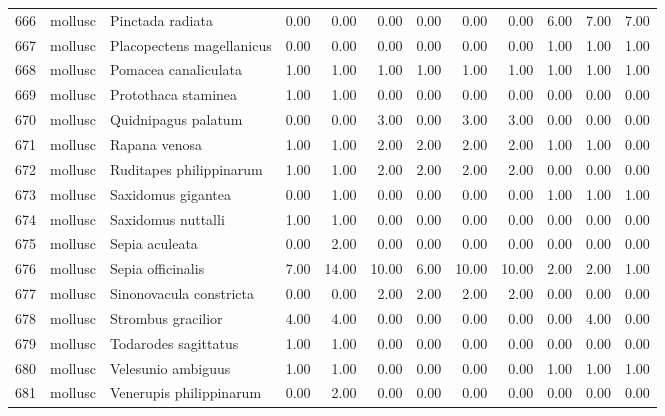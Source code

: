 \begin{table}[ht]
\begin{tabular}{rllrrrrrrrrr}
  666 & mollusc & Pinctada radiata & 0.00 & 0.00 & 0.00 & 0.00 & 0.00 & 0.00 & 6.00 & 7.00 & 7.00 \\ 
  667 & mollusc & Placopectens magellanicus & 0.00 & 0.00 & 0.00 & 0.00 & 0.00 & 0.00 & 1.00 & 1.00 & 1.00 \\ 
  668 & mollusc & Pomacea canaliculata & 1.00 & 1.00 & 1.00 & 1.00 & 1.00 & 1.00 & 1.00 & 1.00 & 1.00 \\ 
  669 & mollusc & Protothaca staminea & 1.00 & 1.00 & 0.00 & 0.00 & 0.00 & 0.00 & 0.00 & 0.00 & 0.00 \\ 
  670 & mollusc & Quidnipagus palatum & 0.00 & 0.00 & 3.00 & 0.00 & 3.00 & 3.00 & 0.00 & 0.00 & 0.00 \\ 
  671 & mollusc & Rapana venosa & 1.00 & 1.00 & 2.00 & 2.00 & 2.00 & 2.00 & 1.00 & 1.00 & 0.00 \\ 
  672 & mollusc & Ruditapes philippinarum & 1.00 & 1.00 & 2.00 & 2.00 & 2.00 & 2.00 & 0.00 & 0.00 & 0.00 \\ 
  673 & mollusc & Saxidomus gigantea & 0.00 & 1.00 & 0.00 & 0.00 & 0.00 & 0.00 & 1.00 & 1.00 & 1.00 \\ 
  674 & mollusc & Saxidomus nuttalli & 1.00 & 1.00 & 0.00 & 0.00 & 0.00 & 0.00 & 0.00 & 0.00 & 0.00 \\ 
  675 & mollusc & Sepia aculeata & 0.00 & 2.00 & 0.00 & 0.00 & 0.00 & 0.00 & 0.00 & 0.00 & 0.00 \\ 
  676 & mollusc & Sepia officinalis & 7.00 & 14.00 & 10.00 & 6.00 & 10.00 & 10.00 & 2.00 & 2.00 & 1.00 \\ 
  677 & mollusc & Sinonovacula constricta & 0.00 & 0.00 & 2.00 & 2.00 & 2.00 & 2.00 & 0.00 & 0.00 & 0.00 \\ 
  678 & mollusc & Strombus gracilior & 4.00 & 4.00 & 0.00 & 0.00 & 0.00 & 0.00 & 0.00 & 4.00 & 0.00 \\ 
  679 & mollusc & Todarodes sagittatus & 1.00 & 1.00 & 0.00 & 0.00 & 0.00 & 0.00 & 0.00 & 0.00 & 0.00 \\ 
  680 & mollusc & Velesunio ambiguus & 1.00 & 1.00 & 0.00 & 0.00 & 0.00 & 0.00 & 1.00 & 1.00 & 1.00 \\ 
  681 & mollusc & Venerupis philippinarum & 0.00 & 2.00 & 0.00 & 0.00 & 0.00 & 0.00 & 0.00 & 0.00 & 0.00 \\ 
   \hline
\end{tabular}
\end{table}